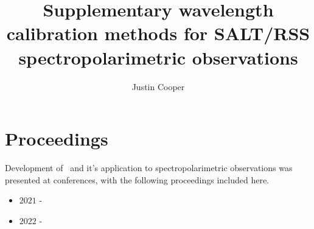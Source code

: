 \documentclass{thesis}
\title{%
    \textbf{%
        Supplementary wavelength calibration methods for SALT/RSS spectropolarimetric observations
    }
}
\author{Justin Cooper}
\begin{document}
\frontmatter
\maketitle
\clearpage




\tableofcontents

\printglossary[type=\acronymtype, style=super, title={List of Acronyms and Symbols}]

\mainmatter






\appendix



\chapter{Proceedings} \label{app:papers}

Development of \stops\ and it's application to spectropolarimetric observations was presented at conferences, with the following proceedings included here.

\begin{itemize}
    \item {} $2021$ - \citet*{cooper_HEASA2021}
    \item {} $2022$ - \citet*{cooper_HEASA2022}
\end{itemize}




\backmatter



\printglossary[type=main, title={Glossary}]
\end{document}
